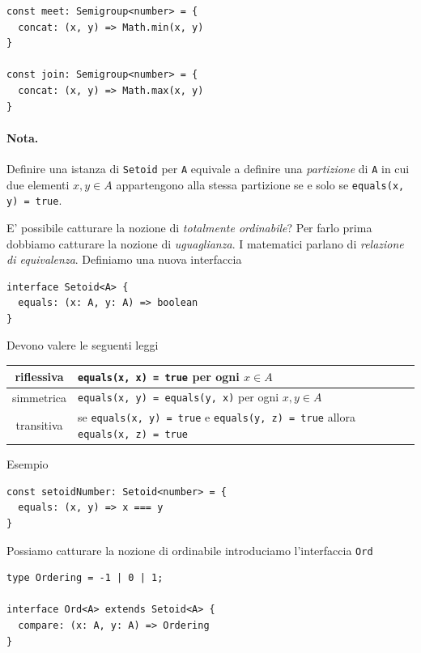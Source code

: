 \documentclass[12pt]{article}
\begin{document}
\begin{verbatim}
const meet: Semigroup<number> = {
  concat: (x, y) => Math.min(x, y)
}

const join: Semigroup<number> = {
  concat: (x, y) => Math.max(x, y)
}
\end{verbatim}

\paragraph{Nota. } Definire una istanza di \texttt{Setoid} per \texttt{A} equivale a definire una \emph{partizione} di \texttt{A} in cui due
elementi $x, y \in A$ appartengono alla stessa partizione se e solo se \texttt{equals(x, y) = true}.

E' possibile catturare la nozione di \emph{totalmente ordinabile}? Per farlo prima dobbiamo catturare la nozione di \emph{uguaglianza}.
I matematici parlano di \emph{relazione di equivalenza}.
Definiamo una nuova interfaccia

\begin{verbatim}
interface Setoid<A> {
  equals: (x: A, y: A) => boolean
}
\end{verbatim}

Devono valere le seguenti leggi

\begin{center}
\bgroup
\def\arraystretch{1.5}
\begin{tabular}{ |c|p{10cm}| }
\hline
riflessiva & \texttt{equals(x, x) = true} per ogni $x \in A$ \\
\hline
simmetrica & \texttt{equals(x, y) = equals(y, x)} per ogni $x, y \in A$ \\
\hline
transitiva & se \texttt{equals(x, y) = true} e \texttt{equals(y, z) = true} allora \texttt{equals(x, z) = true} \\
\hline
\end{tabular}
\egroup
\end{center}

Esempio

\begin{verbatim}
const setoidNumber: Setoid<number> = {
  equals: (x, y) => x === y
}
\end{verbatim}

Possiamo catturare la nozione di ordinabile introduciamo l'interfaccia \texttt{Ord}

\begin{verbatim}
type Ordering = -1 | 0 | 1;

interface Ord<A> extends Setoid<A> {
  compare: (x: A, y: A) => Ordering
}
\end{verbatim}
\end{document}

